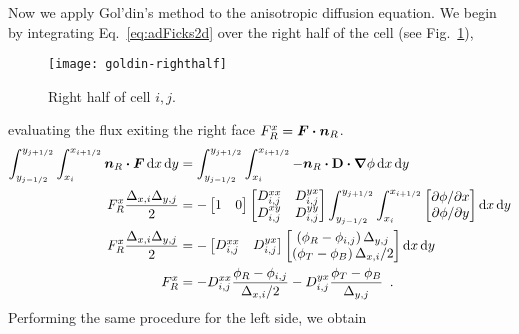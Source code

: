Now we apply Gol'din's method to the anisotropic diffusion equation. We begin
by integrating Eq.~\eqref{eq:adFicks2d} over the right half of the
cell (see Fig.~\ref{fig:goldinRight}),
\begin{figure}[htb]
  \centering
  \texttt{[image: goldin-righthalf]}
  \caption{Right half of cell $i,j$.}
  \label{fig:goldinRight}
\end{figure}
evaluating the flux exiting the right face $F_R^x = \bm{F}\bm{\cdot}\bm{n}_R$.
\begin{align*}
\int_{y_{j-1/2}}^{y_{j+1/2}} \int_{x_{i}}^{x_{i+1/2}}
\vec{n}_R \vd \vec{F}
\ud x \ud y
&=
\int_{y_{j-1/2}}^{y_{j+1/2}} \int_{x_{i}}^{x_{i+1/2}}
-\vec{n}_R \vd \Dtens \vd \grad \phi
\ud x \ud y
\\
F_R^x \frac{\Delta_{x,i} \Delta_{y,j}}{2}
&=
-
\begin{bmatrix}
  1 & 0
\end{bmatrix}
\begin{bmatrix}
  D_{i,j}^{xx} & D_{i,j}^{yx} \\
  D_{i,j}^{xy} & D_{i,j}^{yy}
\end{bmatrix}
\int_{y_{j-1/2}}^{y_{j+1/2}} \int_{x_{i}}^{x_{i+1/2}}
\begin{bmatrix}
  \tpder{\phi}{x} \\
  \tpder{\phi}{y}
\end{bmatrix}
\ud x \ud y
\\
F_R^x \frac{\Delta_{x,i} \Delta_{y,j}}{2}
&=
-
\begin{bmatrix}
  D_{i,j}^{xx} & D_{i,j}^{yx}
\end{bmatrix}
\begin{bmatrix}
  \left( \phi_R - \phi_{i,j} \right) \Delta_{y,j} \\
  \left( \phi_T - \phi_B \right) \Delta_{x,i} / 2
\end{bmatrix}
\ud x \ud y
\\
F_R^x
&= 
- D_{i,j}^{xx} \frac{\phi_R - \phi_{i,j}}{ \Delta_{x,i} / 2}
- D_{i,j}^{yx} \frac{\phi_T - \phi_B}{ \Delta_{y,j} }\ \,.
\end{align*}
Performing the same procedure for the left side, we obtain
